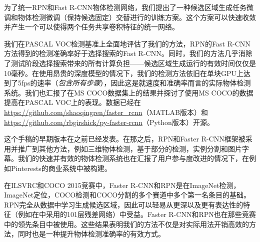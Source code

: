 \documentclass[../main]{subfile}
\begin{document}
为了统一RPN和Fast R-CNN\cite{fastrcnn}物体检测网络，我们提出了一种候选区域生成任务微调和物体检测微调（保持候选固定）交替进行的训练方案。这个方案可以快速收敛并产生一个可以使得两个任务共享卷积特征的统一网络。

我们在PASCAL VOC检测基准上全面地评估了我们的方法，RPN的Fast R-CNN方法得到的检测准确率好于选择搜索的Fast R-CNN。同时，我们的方法几乎消除了测试阶段选择搜索带来的所有计算负担——候选区域生成运行的有效时间仅仅是10毫秒。在使用昂贵的深度模型\cite{vgg}的情况下，我们的检测方法依旧在单块GPU上达到了5fps的速率（\textit{包含所有步骤}），因此这是就速度和准确率而言的实际物体检测系统。我们也汇报了在MS COCO数据集上的结果并探讨了使用MS COCO的数据提高在PASCAL VOC上的表现。数据已经在\href{https://github.com/shaoqingren/faster\_rcnn}{https://github.com/shaoqingren/faster\_rcnn}（MATLAB版本）和\href{https://github.com/rbgirshick/py-faster-rcnn}{https://github.com/rbgirshick/py-faster-rcnn}（Python版本）开源。

这个手稿的早期版本在之前已经发表。在那之后，RPN和Faster R-CNN框架被采用并推广到其他方法，例如三维物体检测\cite{3dCase}，基于部分的检测\cite{partCase}，实例分割\cite{segCase}和图片字幕。我们的快速并有效的物体检测系统也在汇报了用户参与度改进的情况下，在例如Pinterests的商业系统中被构建。

在ILSVRC和COCO 2015竞赛中，Faster R-CNN和RPN是在ImageNet检测，ImageNet定位，COCO检测和COCO分割的多个赛道中多个第一名条目的基础。RPN完全从数据中学习生成候选区域，因此可以轻易从更深以及更有表达性的特征（例如在\cite{resnet}中采用的101层残差网络）中受益。Faster R-CNN和RPN也在那些竞赛中的领先条目中被使用。这些结果表明我们的方法不仅是对实际用法开销高效的方法，同时也是一种提升物体检测准确率的有效方式。
\end{document}
